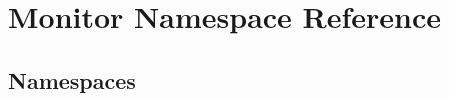 \hypertarget{namespace_monitor}{}\section{Monitor Namespace Reference}
\label{namespace_monitor}
\subsection*{Namespaces}
\begin{DoxyCompactItemize}
\end{DoxyCompactItemize}
